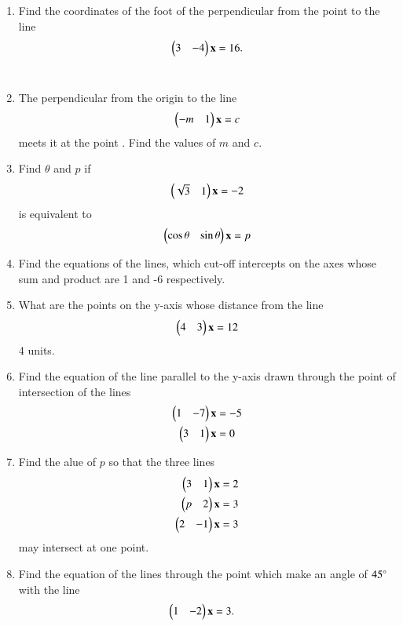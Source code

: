 \begin{enumerate}[label=\arabic*.,ref=\thesubsection.\theenumi]
\item Find the coordinates of the foot of the perpendicular from the point  to the line
%
\begin{align}
\begin{pmatrix}3 & -4\end{pmatrix}\mathbf{x} = 16.
\end{align}
%
\\
\solution

\item The perpendicular from the origin to the line
\begin{align}
\begin{pmatrix}-m & 1\end{pmatrix}\mathbf{x} = c
\end{align}
%
meets it at the point .  Find the values of $m$ and $c$.
\item Find $\theta$ and $p$ if 
%
\begin{align}
\begin{pmatrix}\sqrt{3} & 1\end{pmatrix}\mathbf{x} = -2
\end{align}
%
is equivalent to
%
\begin{align}
\begin{pmatrix}\cos\theta & \sin\theta\end{pmatrix}\mathbf{x} = p
\end{align}
%
\item Find the equations of the lines, which cut-off intercepts on the axes whose sum and product are 1 and -6 respectively.
%
\item What are the points on the y-axis whose distance from the line 
%
\begin{align}
\begin{pmatrix}4 & 3\end{pmatrix}\mathbf{x} = 12
\end{align}
%
4 units.
%
\item Find the equation of the line parallel to the y-axis drawn through the point of intersection of the lines 
%
\begin{align}
\begin{pmatrix}1 & -7\end{pmatrix}\mathbf{x} &= -5
\\
\begin{pmatrix}3 & 1\end{pmatrix}\mathbf{x} &= 0
\end{align}
%
\item Find the alue of $p$ so that the three lines 
%
\begin{align}
\begin{pmatrix}3 & 1\end{pmatrix}\mathbf{x} &= 2
\\
\begin{pmatrix}p & 2\end{pmatrix}\mathbf{x} &= 3
\\
\begin{pmatrix}2 & -1\end{pmatrix}\mathbf{x} &= 3
\end{align}
%
may intersect at one point.
%
\item Find the equation of the lines through the point  which make an angle of $45\degree$ with the line 
\begin{align}
\myvec{1 & -2}\vec{x} &= 3.

\end{align}
\end{enumerate}
